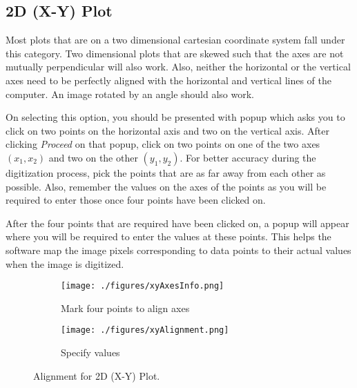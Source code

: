 \documentclass[letterpaper, 10pt]{article}
\begin{document}
\subsection{2D (X-Y) Plot}
Most plots that are on a two dimensional cartesian coordinate system fall under this category. Two dimensional plots that are skewed such that the axes are not mutually perpendicular will also work. Also, neither the horizontal or the vertical axes need to be perfectly aligned with the horizontal and vertical lines of the computer. An image rotated by an angle should also work. 

On selecting this option, you should be presented with popup which asks you to click on two points on the horizontal axis and two on the vertical axis. After clicking \emph{Proceed} on that popup, click on two points on one of the two axes $(x_1, x_2)$ and two on the other $(y_1, y_2)$. For better accuracy during the digitization process, pick the points that are as far away from each other as possible. Also, remember the values on the axes of the points as you will be required to enter those once four points have been clicked on.

After the four points that are required have been clicked on, a popup will appear where you will be required to enter the values at these points. This helps the software map the image pixels corresponding to data points to their actual values when the image is digitized.

\begin{figure}
\centering
{\begin{subfigure}[b]{0.4\textwidth}
\texttt{[image: ./figures/xyAxesInfo.png]}
\caption{Mark four points to align axes}
\end{subfigure}
\begin{subfigure}[b]{0.4\textwidth}
\texttt{[image: ./figures/xyAlignment.png]}
\caption{Specify values}
\end{subfigure}}
\caption{Alignment for 2D (X-Y) Plot.}
\label{fig:xyAlignment}
\end{figure}
\end{document}
